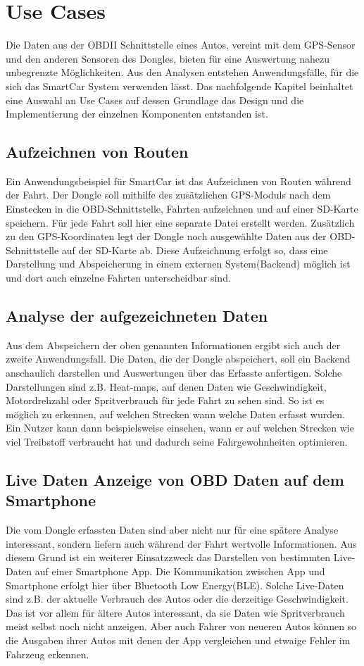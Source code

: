 \chapter{Use Cases}
\label{sec:useCases}
Die Daten aus der OBDII Schnittstelle eines Autos, vereint mit dem GPS-Sensor und den anderen Sensoren des Dongles, bieten für eine Auswertung nahezu unbegrenzte Möglichkeiten. Aus den Analysen entstehen Anwendungsfälle, für die sich das SmartCar System verwenden lässt. Das nachfolgende Kapitel beinhaltet eine Auswahl an Use Cases auf dessen Grundlage das Design und die Implementierung der einzelnen Komponenten entstanden ist.
\section{Aufzeichnen von Routen}
\label{uc:routen}
Ein Anwendungsbeispiel für SmartCar ist das Aufzeichnen von Routen während der Fahrt. Der Dongle soll mithilfe des zusätzlichen GPS-Moduls nach dem Einstecken in die OBD-Schnittstelle,  Fahrten aufzeichnen und auf einer SD-Karte speichern. Für jede Fahrt soll hier eine separate Datei erstellt werden. Zusätzlich zu den GPS-Koordinaten legt der Dongle noch ausgewählte Daten aus der OBD-Schnittstelle auf der SD-Karte ab. Diese Aufzeichnung erfolgt so, dass eine Darstellung und Abspeicherung in einem externen System(Backend) möglich ist und dort auch einzelne Fahrten unterscheidbar sind.
\section{Analyse der aufgezeichneten Daten}
\label{Sec_AnayseDerAufgezeichnetenDaten}
\label{uc:analyse}
Aus dem Abspeichern der oben genannten Informationen ergibt sich auch der zweite Anwendungsfall. Die Daten, die der Dongle abspeichert, soll ein Backend anschaulich darstellen und Auswertungen über das Erfasste anfertigen. Solche Darstellungen sind z.B. Heat-maps, auf denen Daten wie Geschwindigkeit, Motordrehzahl oder Spritverbrauch für jede Fahrt zu sehen sind. So ist es möglich zu erkennen, auf welchen Strecken wann welche Daten erfasst wurden. Ein Nutzer kann dann beispielsweise einsehen, wann er auf welchen Strecken wie viel Treibstoff verbraucht hat und dadurch seine Fahrgewohnheiten optimieren.
\section{Live Daten Anzeige von OBD Daten auf dem Smartphone}
\label{uc:live}
Die vom Dongle erfassten Daten sind aber nicht nur für eine spätere Analyse interessant, sondern liefern auch während der Fahrt wertvolle Informationen. Aus diesem Grund ist ein weiterer Einsatzzweck das Darstellen von bestimmten Live-Daten auf einer Smartphone App. Die Kommunikation zwischen App und Smartphone erfolgt hier über Bluetooth Low Energy(BLE). Solche Live-Daten sind z.B. der aktuelle Verbrauch des Autos oder die derzeitige Geschwindigkeit. Das ist vor allem für ältere Autos interessant, da sie Daten wie Spritverbrauch meist selbst noch nicht anzeigen. Aber auch Fahrer von neueren Autos können so die Ausgaben ihrer Autos mit denen der App vergleichen und etwaige Fehler im Fahrzeug erkennen.
 
